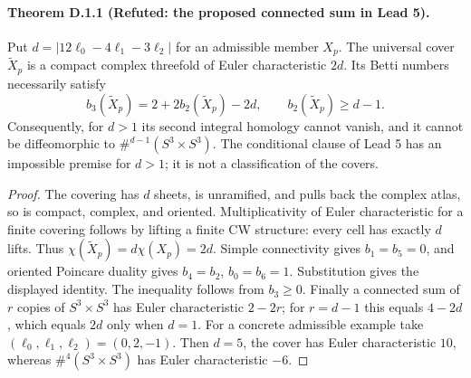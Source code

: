 \paragraph{Theorem D.1.1 (Refuted: the proposed connected sum in Lead 5).}
Put $d=|12\ell_0-4\ell_1-3\ell_2|$ for an admissible member $X_p$.
The universal cover $\widetilde X_p$ is a compact complex threefold of
Euler characteristic $2d$. Its Betti numbers necessarily satisfy
\[
 b_3(\widetilde X_p)=2+2b_2(\widetilde X_p)-2d,
 \qquad b_2(\widetilde X_p)\geq d-1.
\]
Consequently, for $d>1$ its second integral homology cannot vanish,
and it cannot be diffeomorphic to $\#^{d-1}(S^3\times S^3)$.
The conditional clause of Lead 5 has an impossible premise for $d>1$;
it is not a classification of the covers.
\begin{proof}
The covering has $d$ sheets, is unramified, and pulls back the complex
atlas, so is compact, complex, and oriented. Multiplicativity of Euler
characteristic for a finite covering follows by lifting a finite CW
structure: every cell has exactly $d$ lifts. Thus
$\chi(\widetilde X_p)=d\chi(X_p)=2d$.
Simple connectivity gives $b_1=b_5=0$, and oriented Poincare duality gives
$b_4=b_2$, $b_0=b_6=1$. Substitution gives the displayed identity. The
inequality follows from $b_3\geq0$. Finally a connected sum of $r$
copies of $S^3\times S^3$ has Euler characteristic $2-2r$; for $r=d-1$
this equals $4-2d$, which equals $2d$ only when $d=1$.
For a concrete admissible example take $(\ell_0,\ell_1,\ell_2)=(0,2,-1)$.
Then $d=5$, the cover has Euler characteristic $10$, whereas
$\#^4(S^3\times S^3)$ has Euler characteristic $-6$.
\end{proof}

